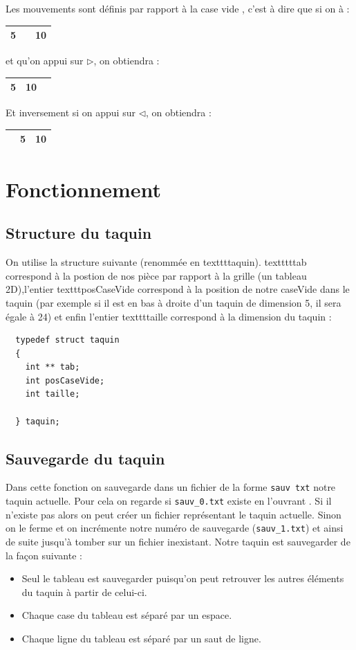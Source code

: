 \documentclass[a4paper]{article}
\begin{document}
Les mouvements sont définis par rapport à la case vide , c'est à dire que si on à :
\begin{tabular}{|c|c|c|}
  \hline
  5 &  & 10 \\
  \hline
\end{tabular}
et qu'on appui sur $\triangleright$, on obtiendra :
\begin{tabular}{|c|c|c|}
  \hline
  5 & 10 &   \\
  \hline
\end{tabular}
Et inversement si on appui sur $\triangleleft$, on obtiendra :
\begin{tabular}{|c|c|c|}
  \hline
  & 5 & 10  \\
  \hline
\end{tabular}


\section{Fonctionnement}
\label{sec:fonctionnement}

\subsection{Structure du taquin}
\label{subsec:structTaquin}

On utilise la structure suivante (renommée en texttt{taquin}). textttt{tab} correspond à la postion de nos pièce par rapport à la grille (un tableau 2D),l'entier texttt{posCaseVide} correspond à la position de notre caseVide dans le taquin (par exemple si il est en bas à droite d'un taquin de dimension 5, il sera égale à 24) et enfin l'entier texttt{taille} correspond à la dimension du taquin  :

\begin{lstlisting}
  typedef struct taquin
  {
    int ** tab;
    int posCaseVide;
    int taille;
    
  } taquin;
\end{lstlisting}


\subsection{Sauvegarde du taquin}
\label{subsec:sauv}

Dans cette fonction on sauvegarde dans un fichier de la forme \texttt{sauv txt} notre taquin actuelle. Pour cela on regarde si \texttt{sauv\_0.txt} existe en l'ouvrant . Si il n'existe pas alors on peut créer un fichier représentant le taquin actuelle. Sinon on le ferme et on incrémente notre numéro de sauvegarde (\texttt{sauv\_1.txt}) et ainsi de suite jusqu'à tomber sur un fichier inexistant. Notre taquin est sauvegarder de la façon suivante :
\begin{itemize}
\item Seul le tableau est sauvegarder puisqu'on peut retrouver les autres éléments du taquin à partir de celui-ci.
\item Chaque case du tableau est séparé par un espace.
\item Chaque ligne du tableau est séparé par un saut de ligne.
\end{itemize}
\end{document}
